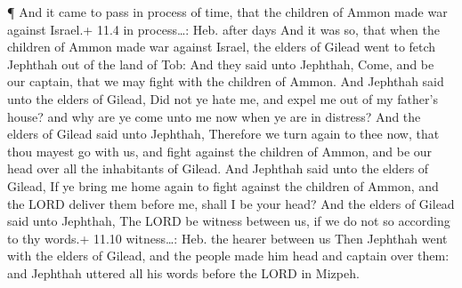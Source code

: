  ¶ And it came to pass in process of time, that the children
of Ammon made war against Israel.+ 11.4 in process\ldots: Heb. after
days  And it was so, that when the children of Ammon made
war against Israel, the elders of Gilead went to fetch Jephthah out of
the land of Tob:  And they said unto Jephthah, Come, and be
our captain, that we may fight with the children of Ammon. 
And Jephthah said unto the elders of Gilead, Did not ye hate me, and
expel me out of my father's house? and why are ye come unto me now when
ye are in distress?  And the elders of Gilead said unto
Jephthah, Therefore we turn again to thee now, that thou mayest go with
us, and fight against the children of Ammon, and be our head over all
the inhabitants of Gilead.  And Jephthah said unto the
elders of Gilead, If ye bring me home again to fight against the
children of Ammon, and the LORD deliver them before me, shall I be your
head?  And the elders of Gilead said unto Jephthah, The
LORD be witness between us, if we do not so according to thy words.+
11.10 witness\ldots: Heb. the hearer between us  Then
Jephthah went with the elders of Gilead, and the people made him head
and captain over them: and Jephthah uttered all his words before the
LORD in Mizpeh.

